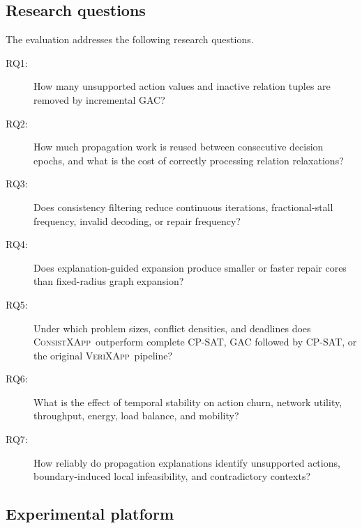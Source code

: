 \documentclass[pdflatex,sn-mathphys-num,iicol,oneside]{sn-jnl}
\newcommand{\method}{\textsc{ConsistXApp}}
\newcommand{\legacy}{\textsc{VeriXApp}}
\begin{document}
\subsection{Research questions}

The evaluation addresses the following research questions.

\begin{description}

    \item[RQ1:]
    How many unsupported action values and inactive relation tuples
    are removed by incremental GAC?

    \item[RQ2:]
    How much propagation work is reused between consecutive decision
    epochs, and what is the cost of correctly processing relation
    relaxations?

    \item[RQ3:]
    Does consistency filtering reduce continuous iterations,
    fractional-stall frequency, invalid decoding, or repair frequency?

    \item[RQ4:]
    Does explanation-guided expansion produce smaller or faster
    repair cores than fixed-radius graph expansion?

    \item[RQ5:]
    Under which problem sizes, conflict densities, and deadlines does
    \method\ outperform complete CP-SAT, GAC followed by CP-SAT, or
    the original \legacy\ pipeline?

    \item[RQ6:]
    What is the effect of temporal stability on action churn, network
    utility, throughput, energy, load balance, and mobility?

    \item[RQ7:]
    How reliably do propagation explanations identify unsupported
    actions, boundary-induced local infeasibility, and contradictory
    contexts?

\end{description}

\subsection{Experimental platform}
\end{document}
